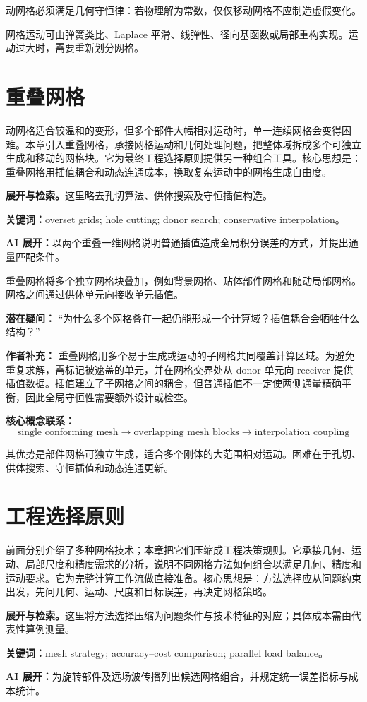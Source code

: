 \documentclass[11pt,openany]{ctexbook}
\newcommand{\studyroute}[3]{%
  \par\smallskip\noindent\textbf{展开与检索。}#1\par
  \noindent\textbf{关键词：}#2。\par
  \noindent\textbf{AI 展开：}#3\par
}
\begin{document}
动网格必须满足几何守恒律：若物理解为常数，仅仅移动网格不应制造虚假变化。

网格运动可由弹簧类比、Laplace 平滑、线弹性、径向基函数或局部重构实现。运动过大时，需要重新划分网格。

\chapter{重叠网格}

\begin{chaptersummary}
动网格适合较温和的变形，但多个部件大幅相对运动时，单一连续网格会变得困难。本章引入重叠网格，承接网格运动和几何处理问题，把整体域拆成多个可独立生成和移动的网格块。它为最终工程选择原则提供另一种组合工具。核心思想是：重叠网格用插值耦合和动态连通成本，换取复杂运动中的网格生成自由度。
\end{chaptersummary}
\studyroute{这里略去孔切算法、供体搜索及守恒插值构造。}{overset grids; hole cutting; donor search; conservative interpolation}{以两个重叠一维网格说明普通插值造成全局积分误差的方式，并提出通量匹配条件。}

重叠网格将多个独立网格块叠加，例如背景网格、贴体部件网格和随动局部网格。网格之间通过供体单元向接收单元插值。

\begin{authornote}
\textbf{潜在疑问：}
“为什么多个网格叠在一起仍能形成一个计算域？插值耦合会牺牲什么结构？”

\textbf{作者补充：}
重叠网格用多个易于生成或运动的子网格共同覆盖计算区域。为避免重复求解，需标记被遮盖的单元，并在网格交界处从 donor 单元向 receiver 提供插值数据。插值建立了子网格之间的耦合，但普通插值不一定使两侧通量精确平衡，因此全局守恒性需要额外设计或检查。

\textbf{核心概念联系：}
\[
\text{single conforming mesh}
\longrightarrow
\text{overlapping mesh blocks}
\longrightarrow
\text{interpolation coupling}
\]
\end{authornote}

其优势是部件网格可独立生成，适合多个刚体的大范围相对运动。困难在于孔切、供体搜索、守恒插值和动态连通更新。

\chapter{工程选择原则}

\begin{chaptersummary}
前面分别介绍了多种网格技术；本章把它们压缩成工程决策规则。它承接几何、运动、局部尺度和精度需求的分析，说明不同网格方法如何组合以满足几何、精度和运动要求。它为完整计算工作流做直接准备。核心思想是：方法选择应从问题约束出发，先问几何、运动、尺度和目标误差，再决定网格策略。
\end{chaptersummary}
\studyroute{这里将方法选择压缩为问题条件与技术特征的对应；具体成本需由代表性算例测量。}{mesh strategy; accuracy--cost comparison; parallel load balance}{为旋转部件及远场波传播列出候选网格组合，并规定统一误差指标与成本统计。}
\end{document}
